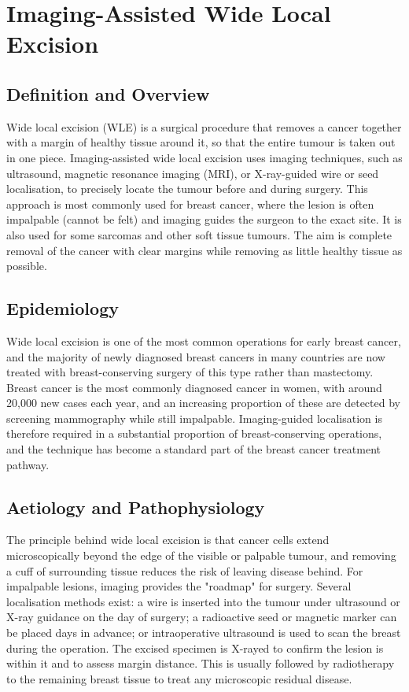 \chapter{Imaging-Assisted Wide Local Excision}

\section*{Definition and Overview}
Wide local excision (WLE) is a surgical procedure that removes a cancer together with a margin of healthy tissue around it, so that the entire tumour is taken out in one piece. Imaging-assisted wide local excision uses imaging techniques, such as ultrasound, magnetic resonance imaging (MRI), or X-ray-guided wire or seed localisation, to precisely locate the tumour before and during surgery. This approach is most commonly used for breast cancer, where the lesion is often impalpable (cannot be felt) and imaging guides the surgeon to the exact site. It is also used for some sarcomas and other soft tissue tumours. The aim is complete removal of the cancer with clear margins while removing as little healthy tissue as possible.

\section*{Epidemiology}
Wide local excision is one of the most common operations for early breast cancer, and the majority of newly diagnosed breast cancers in many countries are now treated with breast-conserving surgery of this type rather than mastectomy. Breast cancer is the most commonly diagnosed cancer in women, with around 20,000 new cases each year, and an increasing proportion of these are detected by screening mammography while still impalpable. Imaging-guided localisation is therefore required in a substantial proportion of breast-conserving operations, and the technique has become a standard part of the breast cancer treatment pathway.

\section*{Aetiology and Pathophysiology}
The principle behind wide local excision is that cancer cells extend microscopically beyond the edge of the visible or palpable tumour, and removing a cuff of surrounding tissue reduces the risk of leaving disease behind. For impalpable lesions, imaging provides the "roadmap" for surgery. Several localisation methods exist: a wire is inserted into the tumour under ultrasound or X-ray guidance on the day of surgery; a radioactive seed or magnetic marker can be placed days in advance; or intraoperative ultrasound is used to scan the breast during the operation. The excised specimen is X-rayed to confirm the lesion is within it and to assess margin distance. This is usually followed by radiotherapy to the remaining breast tissue to treat any microscopic residual disease.

